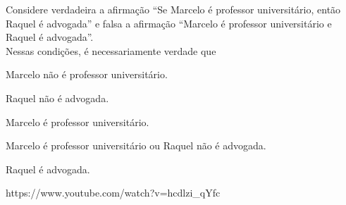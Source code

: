 \begin{Large}
\questao{}
{Considere verdadeira a afirmação “Se Marcelo é professor universitário, então Raquel é advogada” e falsa a afirmação “Marcelo é professor universitário e Raquel é advogada”.\\
Nessas condições, é necessariamente verdade que}
{
\item Marcelo não é professor universitário.
\item Raquel não é advogada.
\item Marcelo é professor universitário.
\item Marcelo é professor universitário ou Raquel não é advogada.
\item Raquel é advogada.}
{https://www.youtube.com/watch?v=hcdlzi_qYfc}



\end{Large}

